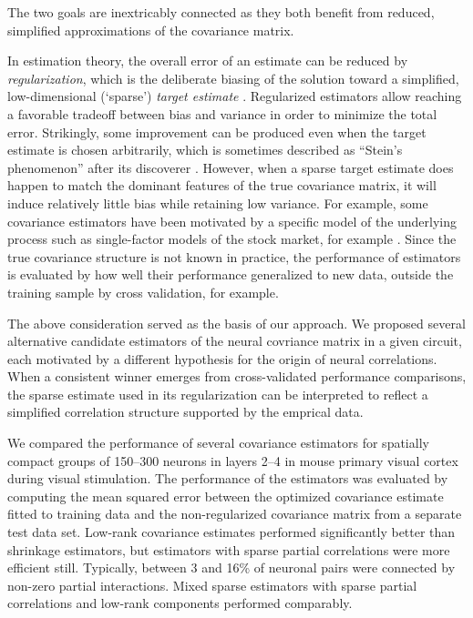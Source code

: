 The two goals are inextricably connected as they both benefit from reduced, simplified approximations of the covariance matrix.

In estimation theory, the overall error of an estimate can be reduced by \emph{regularization}, which is the deliberate biasing of the solution toward a simplified, low-dimensional (`sparse') \emph{target estimate} \citep{Schafer:2005,Bickel:2006}.
Regularized estimators allow reaching a favorable tradeoff between bias and variance in order to minimize the total error.
Strikingly, some improvement can be produced even when the target estimate is chosen arbitrarily, which is sometimes described as ``Stein's phenomenon'' after its discoverer \cite{Stein:1956}.   However, when a sparse target estimate does happen to match the dominant features of the true covariance matrix, it will induce relatively little bias while retaining low variance.  For example, some covariance estimators have been motivated by a specific model of the underlying process such as single-factor models of the stock market, for example \citep{Ledoit:2003}. 
Since the true covariance structure is not known in practice, the performance of estimators is evaluated by how well their performance generalized to new data, outside the training sample by cross validation, for example. 

The above consideration served as the basis of our approach.  We proposed several alternative candidate estimators of the neural covriance matrix in a given circuit, each motivated by a different hypothesis for the origin of neural correlations.  When a consistent winner emerges from cross-validated performance comparisons, the sparse estimate used in its regularization can be interpreted to reflect a simplified correlation structure supported by the emprical data.  

We compared the performance of several covariance estimators for spatially compact groups of 150--300 neurons in layers 2--4 in mouse primary visual cortex during visual stimulation.   The performance of the estimators was evaluated by computing the mean squared error between the optimized covariance estimate fitted to training data and the non-regularized covariance matrix from a separate test data set.  Low-rank covariance estimates performed significantly better than shrinkage estimators, but estimators with sparse partial correlations were more efficient still. Typically, between 3 and 16\% of neuronal pairs were connected by non-zero partial interactions.  Mixed sparse estimators with sparse partial correlations and low-rank components performed comparably. 

